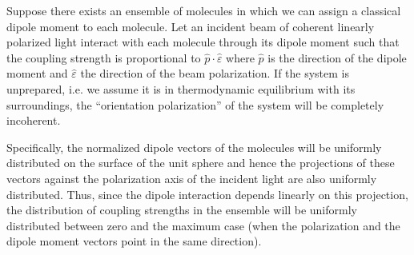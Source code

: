 \label{polarization damping}
Suppose there exists an ensemble of molecules in which we can assign a classical dipole moment to each molecule. Let an incident beam of coherent linearly polarized light interact with each molecule through its dipole moment such that the coupling strength is proportional to $\hat{p} \cdot \hat{\varepsilon}$ where $\hat{p}$ is the direction of the dipole moment and $\hat{\varepsilon}$ the direction of the beam polarization. If the system is unprepared, i.e. we assume it is in thermodynamic equilibrium with its surroundings, the ``orientation polarization'' of the system will be completely incoherent.

Specifically, the normalized dipole vectors of the molecules will be uniformly distributed on the surface of the unit sphere and hence the projections of these vectors against the polarization axis of the incident light are also uniformly distributed. Thus, since the dipole interaction depends linearly on this projection, the distribution of coupling strengths in the ensemble will be uniformly distributed between zero and the maximum case (when the polarization and the dipole moment vectors point in the same direction).

